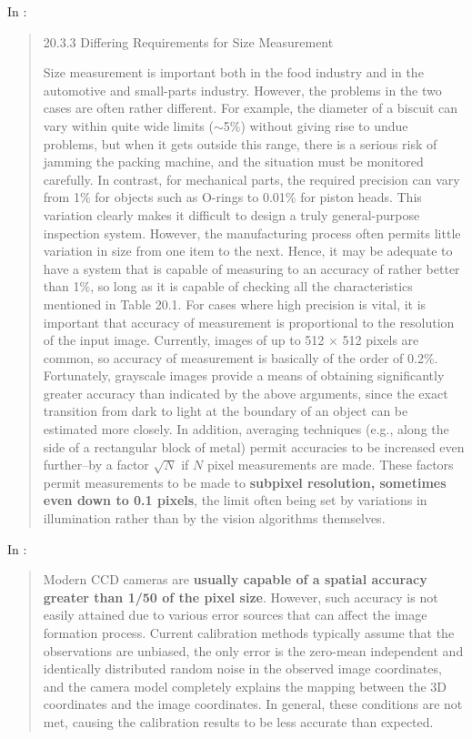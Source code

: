 \documentclass[a4paper,12pt]{article}
\begin{document}
In \cite{Davies:2012:CMV:2341317}:
\begin{quotation}
20.3.3 Differing Requirements for Size Measurement

Size measurement is important both in the food industry and in the automotive
and small-parts industry. However, the problems in the two cases are often rather
different. For example, the diameter of a biscuit can vary within quite wide limits
($\sim$5\%) without giving rise to undue problems, but when it gets outside this range,
there is a serious risk of jamming the packing machine, and the situation must be
monitored carefully. In contrast, for mechanical parts, the required precision can
vary from 1\% for objects such as O-rings to 0.01\% for piston heads. This variation
clearly makes it difficult to design a truly general-purpose inspection system.
However, the manufacturing process often permits little variation in size from one
item to the next. Hence, it may be adequate to have a system that is capable of
measuring to an accuracy of rather better than 1\%, so long as it is capable of
checking all the characteristics mentioned in Table 20.1.
For cases where high precision is vital, it is important that accuracy of measurement
is proportional to the resolution of the input image. Currently, images of
up to 512 $\times$ 512 pixels are common, so accuracy of measurement is basically of
the order of 0.2\%. Fortunately, grayscale images provide a means of obtaining
significantly greater accuracy than indicated by the above arguments, since the
exact transition from dark to light at the boundary of an object can be estimated
more closely. In addition, averaging techniques (e.g., along the side of a rectangular
block of metal) permit accuracies to be increased even further--by a factor $\sqrt{N}$
if
$N$ pixel measurements are made. These factors permit measurements to be made to
\textbf{subpixel resolution, sometimes even down to 0.1 pixels}, the limit often being set by
variations in illumination rather than by the vision algorithms themselves.
\end{quotation}

In \cite{oulu}:
\begin{quotation}
Modern CCD cameras are \textbf{usually capable of a spatial accuracy greater than 1/50 of the pixel size}. However, such accuracy is not easily attained due to various error sources that can affect the image formation process. Current calibration methods typically assume that the observations are unbiased, the only error is the zero-mean independent and identically distributed random noise in the observed image coordinates, and the camera model completely explains the mapping between the 3D coordinates and the image coordinates. In general, these conditions are not met, causing the calibration results to be less accurate than expected.
\end{quotation}
\end{document}
